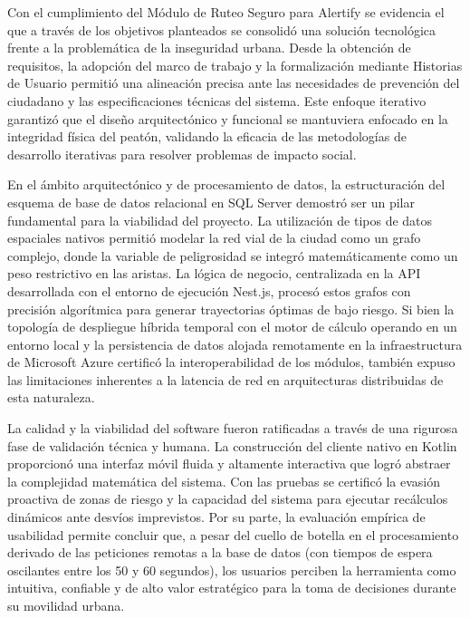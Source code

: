 Con el cumplimiento del Módulo de Ruteo Seguro para Alertify se evidencia el que a través de los objetivos planteados se consolidó una solución tecnológica frente a la problemática de la inseguridad urbana. Desde la obtención de requisitos, la adopción del marco de trabajo y la formalización mediante Historias de Usuario permitió una alineación precisa ante las necesidades de prevención del ciudadano y las especificaciones técnicas del sistema. Este enfoque iterativo garantizó que el diseño arquitectónico y funcional se mantuviera enfocado en la integridad física del peatón, validando la eficacia de las metodologías de desarrollo iterativas para resolver problemas de impacto social.

En el ámbito arquitectónico y de procesamiento de datos, la estructuración del esquema de base de datos relacional en SQL Server demostró ser un pilar fundamental para la viabilidad del proyecto. La utilización de tipos de datos espaciales nativos permitió modelar la red vial de la ciudad como un grafo complejo, donde la variable de peligrosidad se integró matemáticamente como un peso restrictivo en las aristas. La lógica de negocio, centralizada en la API desarrollada con el entorno de ejecución Nest.js, procesó estos grafos con precisión algorítmica para generar trayectorias óptimas de bajo riesgo. Si bien la topología de despliegue híbrida temporal con el motor de cálculo operando en un entorno local y la persistencia de datos alojada remotamente en la infraestructura de Microsoft Azure certificó la interoperabilidad de los módulos, también expuso las limitaciones inherentes a la latencia de red en arquitecturas distribuidas de esta naturaleza.

La calidad  y la viabilidad del software fueron ratificadas a través de una rigurosa fase de validación técnica y humana. La construcción del cliente nativo en Kotlin proporcionó una interfaz móvil fluida y altamente interactiva que logró abstraer la complejidad matemática del sistema. Con las pruebas se certificó la evasión proactiva de zonas de riesgo y la capacidad del sistema para ejecutar recálculos dinámicos ante desvíos imprevistos. Por su parte, la evaluación empírica de usabilidad permite concluir que, a pesar del cuello de botella en el procesamiento derivado de las peticiones remotas a la base de datos (con tiempos de espera oscilantes entre los 50 y 60 segundos), los usuarios perciben la herramienta como intuitiva, confiable y de alto valor estratégico para la toma de decisiones durante su movilidad urbana.